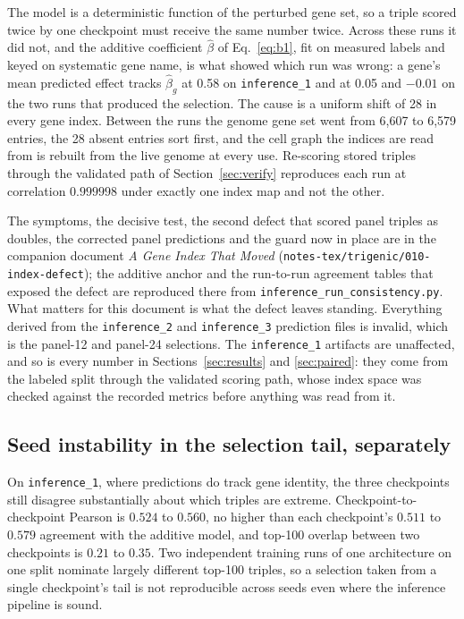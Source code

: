 The model is a deterministic function of the perturbed gene set, so a triple
scored twice by one checkpoint must receive the same number twice. Across these
runs it did not, and the additive coefficient $\hat{\beta}$ of Eq.~\ref{eq:b1},
fit on measured labels and keyed on systematic gene name, is what showed which
run was wrong: a gene's mean predicted effect tracks $\hat{\beta}_g$ at 0.58 on
\texttt{inference\_1} and at 0.05 and $-0.01$ on the two runs that produced the
selection. The cause is a uniform shift of 28 in every gene index. Between the
runs the genome gene set went from 6{,}607 to 6{,}579 entries, the 28 absent
entries sort first, and the cell graph the indices are read from is rebuilt from
the live genome at every use. Re-scoring stored triples through the validated
path of Section~\ref{sec:verify} reproduces each run at correlation $0.999998$
under exactly one index map and not the other.

The symptoms, the decisive test, the second defect that scored panel triples as
doubles, the corrected panel predictions and the guard now in place are in the
companion document \emph{A Gene Index That Moved}
(\texttt{notes-tex/trigenic/010-index-defect}); the additive anchor and the run-to-run
agreement tables that exposed the defect are reproduced there from
\texttt{inference\_run\_consistency.py}. What matters for this document is what
the defect leaves standing. Everything derived from the \texttt{inference\_2}
and \texttt{inference\_3} prediction files is invalid, which is the panel-12 and
panel-24 selections. The \texttt{inference\_1} artifacts are unaffected, and so
is every number in Sections~\ref{sec:results} and \ref{sec:paired}: they come
from the labeled split through the validated scoring path, whose index space was
checked against the recorded metrics before anything was read from it.

\subsection{Seed instability in the selection tail, separately}

On \texttt{inference\_1}, where predictions do track gene identity, the three
checkpoints still disagree substantially about which triples are extreme.
Checkpoint-to-checkpoint Pearson is $0.524$ to $0.560$, no higher than each
checkpoint's $0.511$ to $0.579$ agreement with the additive model, and top-100
overlap between two checkpoints is $0.21$ to $0.35$. Two independent training
runs of one architecture on one split nominate largely different top-100
triples, so a selection taken from a single checkpoint's tail is not
reproducible across seeds even where the inference pipeline is sound.
